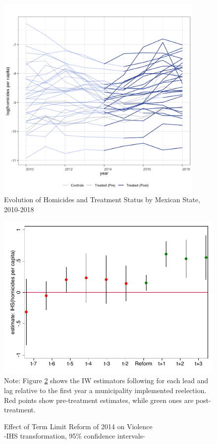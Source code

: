 \documentclass[12pt]{amsart}
\numberwithin{equation}{section}
\theoremstyle{definition}
\theoremstyle{definition}
\theoremstyle{definition}
\begin{document}
\begin{appendix}
\begin{figure}[h] 
\centering
 \caption{Evolution of Homicides and Treatment Status by Mexican State, 2010-2018}
 \label{fig:homicides_evolution}
\includegraphics[width=0.9\textwidth]{Figures/reform_treatment_defunciones.png}
       \captionsetup{justification=centering}
\end{figure}    
 
 	

\begin{figure}[h] 
\centering
\caption{Effect of Term Limit Reform of 2014 on Violence \\ -IHS transformation, 95\% confidence intervals-}
\label{fig:event_study_ihs}

\includegraphics[width=1\textwidth]{Figures/event_study_ihs.pdf}
       \captionsetup{justification=centering}
 Note: Figure \ref{fig:event_study_ihs} shows the IW estimators following \citet{abraham_sun_2020} for each lead and lag relative to the first year a municipality implemented reelection. Red points show pre-treatment estimates, while green ones are post-treatment. 


\end{figure}
\end{appendix}
\end{document}
